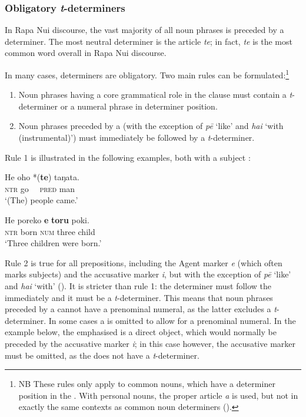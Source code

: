 \subsubsection{Obligatory \textit{t}-determiners}\label{sec:5.3.2.1}

In Rapa Nui discourse, the vast majority of all noun phrases is preceded by a determiner. The most neutral determiner is the article \textit{te}; in fact, \textit{te} is the most common word overall in Rapa Nui discourse.

In many cases, determiners are obligatory. Two main rules can be formulated:\footnote{\label{fn:246}NB These rules only apply to common nouns, which have a determiner position in the . With personal nouns, the proper article \textit{a} is used, but not in exactly the same contexts as common noun determiners ().}

\begin{enumerate}
\item
Noun phrases having a core grammatical role in the clause must contain a \textit{t}-determiner or a numeral phrase in determiner position. 
\item 
Noun phrases preceded by a  (with the exception of \textit{pē} ‘like’ and \textit{hai} ‘with (instrumental)’) must immediately be followed by a \textit{t}-determiner. 
\end{enumerate}

Rule 1 is illustrated in the following examples, both with a subject :

\ea\label{ex:5.14}
\gll He oho *(\textbf{te}) taŋata. \\
\textsc{ntr} go \textsc{~~pred} man \\

\glt
‘(The) people came.’ \textstyleExampleref{[R648.165]} 
\z

\ea\label{ex:5.15}
\gll He poreko \textbf{e} \textbf{toru} poki. \\
\textsc{ntr} born \textsc{num} three child \\

\glt
‘Three children were born.’ \textstyleExampleref{[R352.010]} 
\z

Rule 2 is true for all prepositions, including the Agent marker \textit{e} (which often marks subjects) and the accusative marker \textit{i}, but with the exception of \textit{pē} ‘like’ and \textit{hai} ‘with’ (). It is stricter than rule 1: the determiner must follow the  immediately and it must be a \textit{t}-determiner. This means that noun phrases preceded by a  cannot have a prenominal numeral, as the latter excludes a \textit{t}{}-determiner. In some cases a  is omitted to allow for a prenominal numeral. In the example below, the emphasised  is a direct object, which would normally be preceded by the accusative marker \textit{i}; in this case however, the accusative marker must be omitted, as the  does not have a \textit{t}-determiner.

